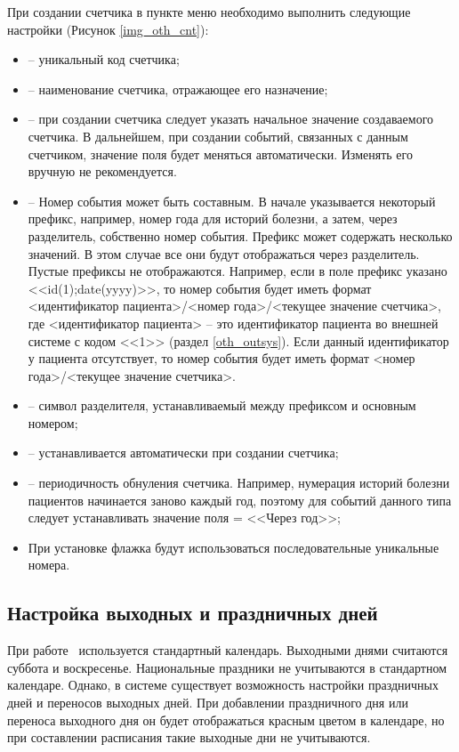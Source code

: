 При создании счетчика в пункте меню  необходимо выполнить следующие настройки (Рисунок \ref{img_oth_cnt}):
\begin{itemize}
 \item {} – уникальный код счетчика;
 \item {} – наименование счетчика, отражающее его назначение;
 \item {} – при создании счетчика следует указать начальное значение создаваемого счетчика. В дальнейшем, при создании событий, связанных с данным счетчиком, значение поля будет меняться автоматически. Изменять его вручную не рекомендуется.
 \item {} – Номер события может быть составным. В начале указывается некоторый префикс, например, номер года для историй болезни, а затем, через разделитель, собственно номер события. Префикс может содержать несколько значений. В этом случае все они будут отображаться через разделитель. Пустые префиксы не отображаются. Например, если в поле префикс указано <<id(1);date(yyyy)>>, то номер события будет иметь формат <идентификатор пациента>/<номер года>/<текущее значение счетчика>, где <идентификатор пациента> – это идентификатор пациента во внешней системе с кодом <<1>> (раздел \ref{oth_outsys}). Если данный идентификатор у пациента отсутствует, то номер события будет иметь формат <номер года>/<текущее значение счетчика>.
 \item {} – символ разделителя, устанавливаемый между префиксом и основным номером;
 \item {} – устанавливается автоматически при создании счетчика;
 \item {} – периодичность обнуления счетчика. Например, нумерация историй болезни пациентов начинается заново каждый год, поэтому для событий данного типа следует устанавливать значение поля  = <<Через год>>;
 \item При установке флажка  будут использоваться последовательные уникальные номера.
\end{itemize}

\subsection{Настройка выходных и праздничных дней}

При работе \tmis~используется стандартный календарь. Выходными днями считаются суббота и воскресенье. Национальные праздники не учитываются в стандартном календаре. Однако, в системе существует возможность настройки праздничных дней и переносов выходных дней. При добавлении праздничного дня или переноса выходного дня он будет отображаться красным цветом в календаре, но при составлении расписания такие выходные дни не учитываются.

